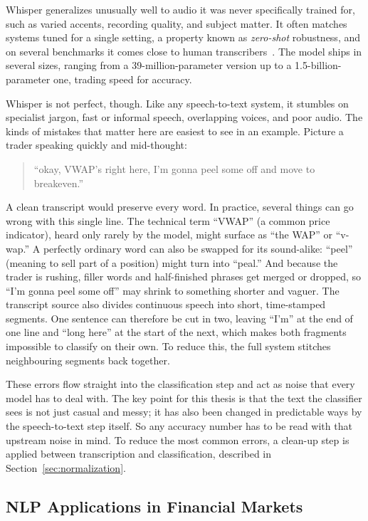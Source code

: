 Whisper generalizes unusually well to audio it was never specifically trained for, such as varied accents, recording quality, and subject matter. It often matches systems tuned for a single setting, a property known as \emph{zero-shot} robustness, and on several benchmarks it comes close to human transcribers~\cite{radford2023whisper}. The model ships in several sizes, ranging from a 39-million-parameter version up to a 1.5-billion-parameter one, trading speed for accuracy.

Whisper is not perfect, though. Like any speech-to-text system, it stumbles on specialist jargon, fast or informal speech, overlapping voices, and poor audio. The kinds of mistakes that matter here are easiest to see in an example. Picture a trader speaking quickly and mid-thought:

\begin{quote}
``okay, VWAP's right here, I'm gonna peel some off and move to breakeven.''
\end{quote}

A clean transcript would preserve every word. In practice, several things can go wrong with this single line. The technical term ``VWAP'' (a common price indicator), heard only rarely by the model, might surface as ``the WAP'' or ``v-wap.'' A perfectly ordinary word can also be swapped for its sound-alike: ``peel'' (meaning to sell part of a position) might turn into ``peal.'' And because the trader is rushing, filler words and half-finished phrases get merged or dropped, so ``I'm gonna peel some off'' may shrink to something shorter and vaguer. The transcript source also divides continuous speech into short, time-stamped segments. One sentence can therefore be cut in two, leaving ``I'm'' at the end of one line and ``long here'' at the start of the next, which makes both fragments impossible to classify on their own. To reduce this, the full system stitches neighbouring segments back together.

These errors flow straight into the classification step and act as noise that every model has to deal with. The key point for this thesis is that the text the classifier sees is not just casual and messy; it has also been changed in predictable ways by the speech-to-text step itself. So any accuracy number has to be read with that upstream noise in mind. To reduce the most common errors, a clean-up step is applied between transcription and classification, described in Section~\ref{sec:normalization}.

\subsection{NLP Applications in Financial Markets}
\label{sec:finance_nlp}

